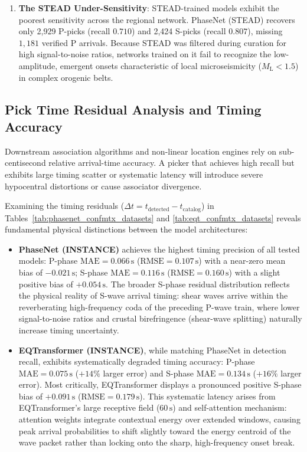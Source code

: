 \begin{enumerate}
  \item \textbf{The STEAD Under-Sensitivity}: STEAD-trained models exhibit the poorest sensitivity across the regional network. PhaseNet (STEAD) recovers only 2,929 P-picks (recall $0.710$) and 2,424 S-picks (recall $0.807$), missing $1{,}181$ verified P arrivals. Because STEAD was filtered during curation for high signal-to-noise ratios, networks trained on it fail to recognize the low-amplitude, emergent onsets characteristic of local microseismicity ($M_{\mathrm{L}} < 1.5$) in complex orogenic belts.
\end{enumerate}

\subsection{Pick Time Residual Analysis and Timing Accuracy}
\label{subsec:picker_timing_residuals}

Downstream association algorithms and non-linear location engines rely on sub-centisecond relative arrival-time accuracy. A picker that achieves high recall but exhibits large timing scatter or systematic latency will introduce severe hypocentral distortions or cause associator divergence.

Examining the timing residuals ($\Delta t = t_{\mathrm{detected}} - t_{\mathrm{catalog}}$) in Tables~\ref{tab:phasenet_confmtx_datasets} and \ref{tab:eqt_confmtx_datasets} reveals fundamental physical distinctions between the model architectures:
\begin{itemize}
  \item \textbf{PhaseNet (INSTANCE)} achieves the highest timing precision of all tested models: P-phase $\mathrm{MAE} = 0.066\,\unit{\second}$ ($\mathrm{RMSE} = 0.107\,\unit{\second}$) with a near-zero mean bias of $-0.021\,\unit{\second}$; S-phase $\mathrm{MAE} = 0.116\,\unit{\second}$ ($\mathrm{RMSE} = 0.160\,\unit{\second}$) with a slight positive bias of $+0.054\,\unit{\second}$. The broader S-phase residual distribution reflects the physical reality of S-wave arrival timing: shear waves arrive within the reverberating high-frequency coda of the preceding P-wave train, where lower signal-to-noise ratios and crustal birefringence (shear-wave splitting) naturally increase timing uncertainty.
  \item \textbf{EQTransformer (INSTANCE)}, while matching PhaseNet in detection recall, exhibits systematically degraded timing accuracy: P-phase $\mathrm{MAE} = 0.075\,\unit{\second}$ ($+14\%$ larger error) and S-phase $\mathrm{MAE} = 0.134\,\unit{\second}$ ($+16\%$ larger error). Most critically, EQTransformer displays a pronounced positive S-phase bias of $+0.091\,\unit{\second}$ ($\mathrm{RMSE} = 0.179\,\unit{\second}$). This systematic latency arises from EQTransformer's large receptive field ($60\,\unit{\second}$) and self-attention mechanism: attention weights integrate contextual energy over extended windows, causing peak arrival probabilities to shift slightly toward the energy centroid of the wave packet rather than locking onto the sharp, high-frequency onset break.
\end{itemize}

